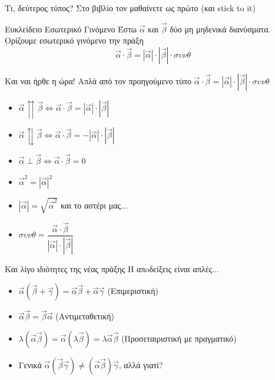 \documentclass{presentation}
\begin{document}
\begin{frame}{Τι, δεύτερος τύπος?}
  Στο βιβλίο τον μαθαίνετε ως πρώτο (και stick to it)
  \begin{block}{Ευκλείδειο Εσωτερικό Γινόμενο}
    Έστω $\vec{α}$ και $\vec{β}$ δύο μη μηδενικά διανύσματα. Ορίζουμε εσωτερικό γινόμενο την πράξη
    $$\vec{α}\cdot\vec{β} = |\vec{α}|\cdot|\vec{β}|\cdot συνθ$$
  \end{block}

\end{frame}

\begin{frame}{Και ναι ήρθε η ώρα!}
  Απλά από τον προηγούμενο τύπο $\vec{α}\cdot\vec{β} = |\vec{α}|\cdot|\vec{β}|\cdot συνθ$
  \begin{itemize}
    \item<1-> $\vec{α}\upuparrows\vec{β}\iff \vec{α}\cdot\vec{β} = |\vec{α}|\cdot|\vec{β}|$
    \item<2-> $\vec{α}\updownarrows\vec{β}\iff \vec{α}\cdot\vec{β} = -|\vec{α}|\cdot|\vec{β}|$
    \item<3-> $\vec{α}\perp\vec{β}\iff \vec{α}\cdot\vec{β} = 0$
    \item<4-> $\vec{α}^2=|\vec{α}|^2$
    \item<5-> $|\vec{α}|=\sqrt{\vec{α}^2}$
           {και το αστέρι μας...}
    \item<7-> $συνθ=\dfrac{\vec{α}\cdot\vec{β}}{|\vec{α}|\cdot|\vec{β}|}$
  \end{itemize}
\end{frame}

\begin{frame}{Και λίγο ιδιότητες της νέας πράξης}
  Η απoδείξεις είναι απλές...
  \begin{itemize}
    \item<1-> $\vec{α}(\vec{β}+\vec{γ})=\vec{α}\vec{β}+\vec{α}\vec{γ}$ (Επιμεριστική)
    \item<2-> $\vec{α}\vec{β}=\vec{β}\vec{α}$ (Αντιμεταθετική)
    \item<3-> $λ(\vec{α}\vec{β})=\vec{α}(λ\vec{β})=λ\vec{α}\vec{β}$ (Προσεταιριστική με πραγματικό)
    \item<4-> Γενικά $\vec{α}(\vec{β}\vec{γ})\ne (\vec{α}\vec{β})\vec{γ}$, αλλά γιατί?
  \end{itemize}
\end{frame}
\end{document}
